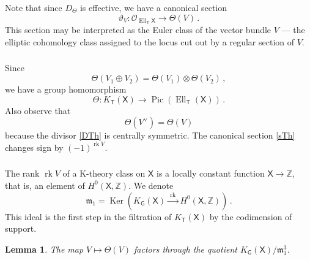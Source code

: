 \documentclass[14pt]{extarticle}
\newcommand{\cOd}{{\cO}^{\raisebox{0.5mm}{$\scriptscriptstyle \bullet$}}}
\newcommand{\Z}{\mathbb{Z}}
\newcommand{\bT}{\mathsf{T}}
\newcommand{\bG}{\mathsf{G}}
\newcommand{\bX}{\mathsf{X}}
\newcommand{\vth}{\vartheta}
\newcommand{\cO}{\mathscr{O}}
\newcommand{\fmo}{\mathfrak{m}_1}
\DeclareMathOperator{\Ker}{Ker}
\DeclareMathOperator{\Ell}{Ell}
\DeclareMathOperator{\rk}{rk}
\DeclareMathOperator{\Pic}{Pic}
\newtheorem{Lemma}{Lemma}[section]
\theoremstyle{definition}
\begin{document}
\subsubsection{} 

Note that since
$D_\Theta$ is effective,  we have a canonical section 
%
\begin{equation}
\vth_V: \cO_{\Ell_\bT \bX} \to \Theta(V)\label{sTh} \,. 
\end{equation}
%
This section may be interpreted as the Euler class of the vector bundle $V$ --- the
elliptic cohomology class assigned to the locus cut out by a regular section of
$V$. 

\subsubsection{}

Since 
$$
\Theta(V_1 \oplus V_2)  = \Theta(V_1) \otimes \Theta(V_2) \,, 
$$
we have a group homomorphism
%
\begin{equation}
\Theta: K_\bT(\bX) \to \Pic \left(\Ell_\bT(\bX)\right)  \,. 
\label{Thom_map}
\end{equation}
%
Also observe that
%
\begin{equation}
\Theta(V^\vee)= \Theta(V) \label{ThVdual}
\end{equation}
%
because the divisor \eqref{DTh} is centrally symmetric. The canonical
section \eqref{sTh} changes sign by $(-1)^{\rk V}$. 

\subsubsection{}

The rank $\rk V$ of a K-theory class on $\bX$ is a locally constant
function $\bX \to \Z$, that is, an element of $H^0(\bX,\Z)$. 
We denote
$$
\fmo  = \Ker (K_\bG(\bX) \xrightarrow{\, \, \rk \, \,} H^0(\bX,\Z)) \,. 
$$
This ideal is the first step in the filtration of $K_\bT(\bX)$ by the
codimension of support.

\begin{Lemma}\label{l_cube} 
  The map $V \mapsto \Theta(V)$ factors through the quotient
  $K_\bG(\bX)/\fmo^3$. 
\end{Lemma}
\end{document}
